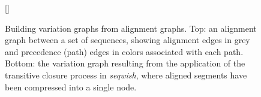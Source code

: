 \vspace{-1em}
\begin{figure}[ht!]
    [\FBwidth]
    {\caption{ Building variation graphs from alignment graphs. Top: an alignment graph between a set of sequences,
        showing alignment edges in grey and precedence (path) edges in colors associated with each path. Bottom: the variation graph
        resulting from the application of the transitive closure process in \textit{seqwish}, where aligned segments have been
        compressed into a single node.
    }\label{fig:from_alignment_to_variation_graph}}

\end{figure}
\vspace{-1em}
